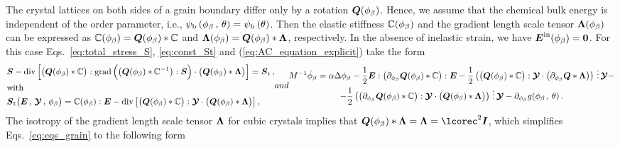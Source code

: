 \documentclass[preprint,review,3p,times,authoryear]{elsarticle}
\begin{document}
The crystal lattices on both sides of a grain boundary differ only by a rotation $\boldsymbol{Q}(\phi_{\beta})$. Hence, we assume that the  chemical bulk energy is independent of the order parameter, i.e., $\psi_{\text{b}}\left( \phi_{\beta}\,,\, \theta \right) = \psi_{\text{b}}\left( \theta \right)$. Then the elastic stiffness $\mathbb{C}(\phi_{\beta})$ and the gradient length scale tensor $\boldsymbol{\Lambda{}}(\phi_{\beta})$ can be expressed as $\mathbb{C}(\phi_{\beta}) = \boldsymbol{Q}(\phi_{\beta})*\mathbb{C}$ and $\boldsymbol{\Lambda{}}(\phi_{\beta}) = \boldsymbol{Q}(\phi_{\beta})*\boldsymbol{\Lambda{}}$, respectively. In the absence of inelastic strain, we have $\boldsymbol{E}^{\text{in}}(\phi_{\beta}) = \boldsymbol{0}$. For this case  Eqs.~\eqref{eq:total_stress_S}, \eqref{eq:const_St}  and (\ref{eq:AC_equation_explicit}) take the form
\begin{subequations}
  \label{eq:eqs_grain}
  \begin{align}
    & \tS -  \diver{\left[ \bigl( \tQ(\phi_{\beta})*\bbC \bigr):\grad{\Bigl( \bigl( \tQ(\phi_{\beta})*\bbC^{-1} \bigr):\tS\Bigr)}\cdot\bigl( \tQ(\phi_{\beta})*\tLcorec \bigr) \right]} = \tSt\,,\\
    &\text{with}\nonumber\\
    &\tSt\bigl( \tE\,,\, \ttY\,,\, \phi_{\beta} \bigr) = \bbC(\phi_{\beta}):\tE - \diver{\left[ \bigl( \tQ(\phi_{\beta})*\bbC \bigr):\ttY\cdot\bigl( \tQ(\phi_{\beta})*\tLcorec \bigr) \right]}\,,
  \end{align}
  and
  \begin{multline}
    \label{eq:AC_equation_grain}
    M^{-1}\sdot\phi_{\beta} = \alpha\Delta\phi_{\beta} - \half\tE:\bigl( \pder{\tQ(\phi_{\beta})}{\phi_{\beta}}*\bbC \bigr):\tE - \half\left(  \bigl( \tQ(\phi_{\beta})*\bbC \bigr):\ttY\cdot\bigl( \pder{\tQ}{\phi_{\beta}}*\tLcorec  \bigr)\right)\tridot \ttY -\\-  \half\left( \bigl( \pder{\tQ(\phi_{\beta})}{\phi_{\beta}}*\bbC  \bigr):\ttY\cdot\bigl( \tQ(\phi_{\beta})*\tLcorec \bigr) \right) \tridot \ttY - \pder{g(\phi_{\beta}\,,\,\theta)}{\phi_{\beta}}\,.
  \end{multline}
\end{subequations}
The isotropy of the gradient length scale tensor $\boldsymbol{\Lambda{}}$ for cubic crystals implies that $ \tQ(\phi_{\beta})*\tLcorec=\tLcorec=\lcorec^{2}\tone$, which simplifies Eqs.~\eqref{eq:eqs_grain} to the following form
\end{document}
